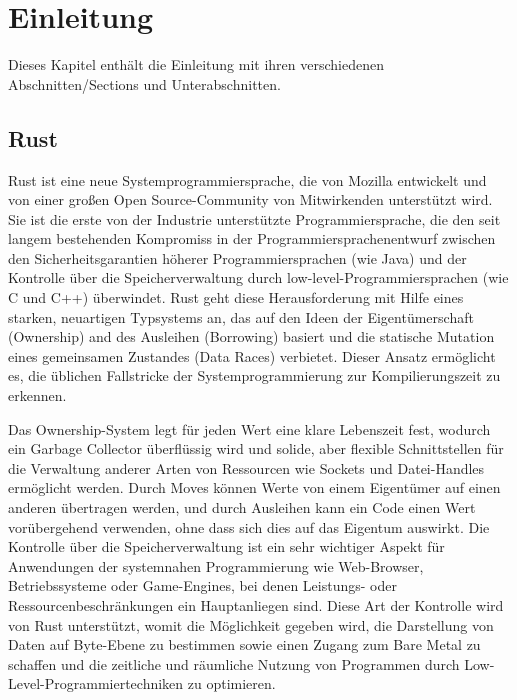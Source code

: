 \chapter{Einleitung}

\nocite{*}

Dieses Kapitel enthält die Einleitung mit ihren verschiedenen Abschnitten/Sections und Unterabschnitten.

\section{Rust}

Rust ist eine neue Systemprogrammiersprache, die von Mozilla entwickelt und von einer großen Open Source-Community von Mitwirkenden unterstützt wird. Sie ist die erste von der Industrie unterstützte Programmiersprache, die den seit langem bestehenden Kompromiss in der Programmiersprachenentwurf zwischen den Sicherheitsgarantien höherer Programmiersprachen (wie Java) und der Kontrolle über die Speicherverwaltung durch low-level-Programmiersprachen (wie C und C++) überwindet. Rust geht diese Herausforderung mit Hilfe eines starken, neuartigen Typsystems an, das auf den Ideen der Eigentümerschaft (Ownership) and des Ausleihen (Borrowing) basiert und die statische Mutation eines gemeinsamen Zustandes (Data Races) verbietet. Dieser Ansatz ermöglicht es, die üblichen Fallstricke der Systemprogrammierung zur Kompilierungszeit zu erkennen.

Das Ownership-System legt für jeden Wert eine klare Lebenszeit fest, wodurch ein Garbage Collector überflüssig wird und solide, aber flexible Schnittstellen für die Verwaltung anderer Arten von Ressourcen wie Sockets und Datei-Handles ermöglicht werden. Durch \glqq Moves\grqq{} können Werte von einem Eigentümer auf einen anderen übertragen werden, und durch Ausleihen kann ein Code einen Wert vorübergehend verwenden, ohne dass sich dies auf das Eigentum auswirkt.
Die Kontrolle über die Speicherverwaltung ist ein sehr wichtiger Aspekt für Anwendungen der systemnahen Programmierung wie Web-Browser, Betriebssysteme oder Game-Engines, bei denen Leistungs- oder Ressourcenbeschränkungen ein Hauptanliegen sind. Diese Art der Kontrolle wird von Rust unterstützt, womit die Möglichkeit gegeben wird, die Darstellung von Daten auf Byte-Ebene zu bestimmen sowie einen Zugang zum \glqq Bare Metal\grqq{} zu schaffen und die zeitliche und räumliche Nutzung von Programmen durch Low-Level-Programmiertechniken zu optimieren.

